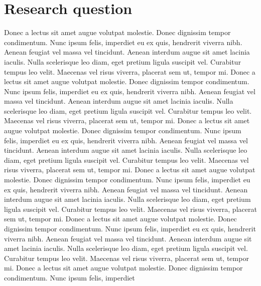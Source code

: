 \documentclass{article}
\begin{document}
\section{Research question}
Donec a lectus sit amet augue volutpat molestie. Donec dignissim tempor condimentum. Nunc ipsum felis, imperdiet
eu ex quis, hendrerit viverra nibh. Aenean feugiat vel massa vel tincidunt. Aenean interdum augue sit amet lacinia
iaculis. Nulla scelerisque leo diam, eget pretium ligula suscipit vel. Curabitur tempus leo velit. Maecenas vel
risus viverra, placerat sem ut, tempor mi.
\vspace{5mm}
\newline
Donec a lectus sit amet augue volutpat molestie. Donec dignissim tempor condimentum. Nunc ipsum felis, imperdiet
eu ex quis, hendrerit viverra nibh. Aenean feugiat vel massa vel tincidunt. Aenean interdum augue sit amet lacinia
iaculis. Nulla scelerisque leo diam, eget pretium ligula suscipit vel. Curabitur tempus leo velit. Maecenas vel
risus viverra, placerat sem ut, tempor mi.
\vspace{5mm}
\newline
Donec a lectus sit amet augue volutpat molestie. Donec dignissim tempor condimentum. Nunc ipsum felis, imperdiet
eu ex quis, hendrerit viverra nibh. Aenean feugiat vel massa vel tincidunt. Aenean interdum augue sit amet lacinia
iaculis. Nulla scelerisque leo diam, eget pretium ligula suscipit vel. Curabitur tempus leo velit. Maecenas vel
risus viverra, placerat sem ut, tempor mi.
Donec a lectus sit amet augue volutpat molestie. Donec dignissim tempor condimentum. Nunc ipsum felis, imperdiet
eu ex quis, hendrerit viverra nibh. Aenean feugiat vel massa vel tincidunt. Aenean interdum augue sit amet lacinia
iaculis. Nulla scelerisque leo diam, eget pretium ligula suscipit vel. Curabitur tempus leo velit. Maecenas vel
risus viverra, placerat sem ut, tempor mi.
\vspace{5mm}
\newline
Donec a lectus sit amet augue volutpat molestie. Donec dignissim tempor condimentum. Nunc ipsum felis, imperdiet
eu ex quis, hendrerit viverra nibh. Aenean feugiat vel massa vel tincidunt. Aenean interdum augue sit amet lacinia
iaculis. Nulla scelerisque leo diam, eget pretium ligula suscipit vel. Curabitur tempus leo velit. Maecenas vel
risus viverra, placerat sem ut, tempor mi.
\vspace{5mm}
\newline
Donec a lectus sit amet augue volutpat molestie. Donec dignissim tempor condimentum. Nunc ipsum felis, imperdiet
\end{document}
